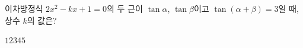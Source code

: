 이차방정식 $2x^2-kx+1=0$의 두 근이 $\tan\alpha$, $\tan\beta$이고 $\tan(\alpha+\beta)=3$일 때, 상수 $k$의 값은?
\begin{choices32}{$1$}{$2$}{$3$}{$4$}{$5$}\end{choices32}
